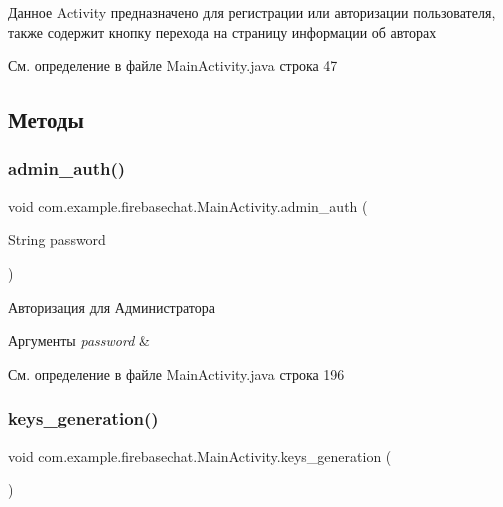 Данное Activity предназначено для регистрации или авторизации пользователя, также содержит кнопку перехода на страницу информации об авторах 

См. определение в файле Main\+Activity.\+java строка 47



\subsection{Методы}
\mbox{\label{classcom_1_1example_1_1firebasechat_1_1_main_activity_abca69f1465f860b8f9eedaa3b360201d}} 
\subsubsection{\texorpdfstring{admin\+\_\+auth()}{admin\_auth()}}
{\footnotesize\ttfamily void com.\+example.\+firebasechat.\+Main\+Activity.\+admin\+\_\+auth (\begin{DoxyParamCaption}\item[{String}]{password }\end{DoxyParamCaption})}



Авторизация для Администратора 


\begin{DoxyParams}{Аргументы}
{\em password} & \\
\hline
\end{DoxyParams}


См. определение в файле Main\+Activity.\+java строка 196

\mbox{\label{classcom_1_1example_1_1firebasechat_1_1_main_activity_a61ce1168261dbdab070cb0497ad845eb}} 
\subsubsection{\texorpdfstring{keys\+\_\+generation()}{keys\_generation()}}
{\footnotesize\ttfamily void com.\+example.\+firebasechat.\+Main\+Activity.\+keys\+\_\+generation (\begin{DoxyParamCaption}{ }\end{DoxyParamCaption})}



